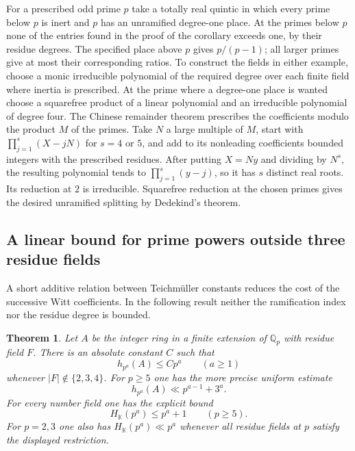 \documentclass[11pt,letterpaper]{article}
\newtheorem{theorem}{Theorem}[section]
\theoremstyle{definition}
\numberwithin{equation}{section}
\begin{document}
For a prescribed odd prime $p$ take a totally real quintic in which
every prime below $p$ is inert and $p$ has an unramified degree-one
place. At the primes below $p$ none of the entries found in the proof
of the corollary exceeds one, by their residue degrees. The specified
place above $p$ gives $p/(p-1)$; all larger primes give at most their
corresponding ratios. To construct the fields in either example,
choose a monic irreducible polynomial of the required degree over
each finite field where inertia is prescribed. At the prime where
a degree-one place is wanted choose a squarefree product of a linear
polynomial and an irreducible polynomial of degree four. The Chinese
remainder theorem prescribes the coefficients modulo the product $M$
of the primes. Take $N$ a large multiple of $M$, start with
$\prod_{j=1}^s(X-jN)$ for $s=4$ or $5$, and add to its nonleading
coefficients bounded integers with the prescribed residues. After
putting $X=Ny$ and dividing by $N^s$, the resulting polynomial tends
to $\prod_{j=1}^s(y-j)$, so it has $s$ distinct real roots. Its
reduction at $2$ is irreducible. Squarefree reduction at the chosen
primes gives the desired unramified splitting by Dedekind's theorem.

\subsection{A linear bound for prime powers outside three residue fields}
\label{sec:local-teich}
A short additive relation between Teichm\"uller constants reduces the
cost of the successive Witt coefficients. In the following result
neither the ramification index nor the residue degree is bounded.

\begin{theorem}\label{thm:hteich}
Let $A$ be the integer ring in a finite extension of $\mathbb Q_p$
with residue field $F$. There is an absolute constant $C$ such that
\[
                 h_{p^a}(A)\le Cp^a\qquad(a\ge1)
\]
whenever $|F|\notin\{2,3,4\}$. For $p\ge5$ one has the more
precise uniform estimate
\[
                    h_{p^a}(A)\ll p^{a-1}+3^a .
\]
For every number field one has the explicit bound
\[
                    H_{\mathbb K}(p^a)\le p^a+1\qquad(p\ge5).
\]
For $p=2,3$ one also has $H_{\mathbb K}(p^a)\ll p^a$ whenever all
residue fields at $p$ satisfy the displayed restriction.
\end{theorem}
\end{document}
